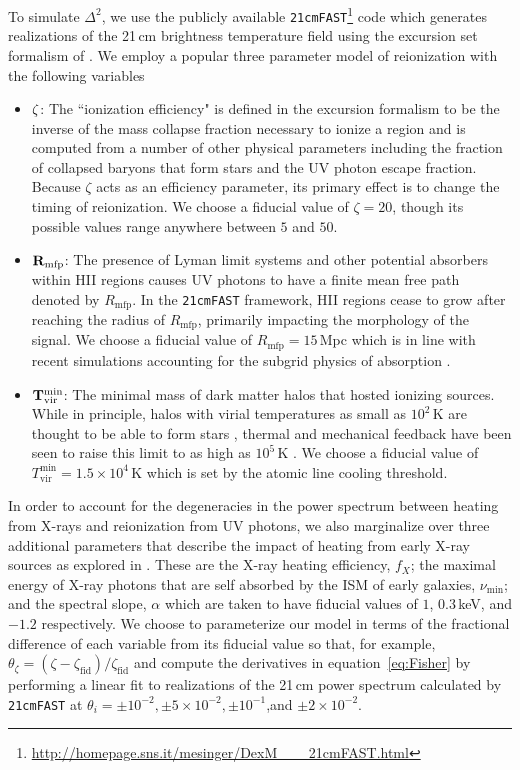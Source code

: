\documentclass[twocolumn]{emulateapj}
\begin{document}
To simulate $\Delta^2$, we use the publicly available {\tt 21cmFAST}\footnote{\url{http://homepage.sns.it/mesinger/DexM___21cmFAST.html}} code \citep{Mesinger:2011} which generates realizations of the 21\,cm brightness temperature field using the excursion set formalism of \citet{Furlanetto:2004}. We employ a popular three parameter model of reionization \citep{Mesinger:2012} with the following variables 
\begin{itemize}
\item ${\bf \zeta}$: The ``ionization efficiency" is defined in the \citet{Furlanetto:2004} excursion formalism to be the inverse of the mass collapse fraction necessary to ionize a region and is computed from a number of other physical parameters including the fraction of collapsed baryons that form stars and the UV photon escape fraction. Because $\zeta$ acts as an efficiency parameter, its primary effect is to change the timing of reionization. We choose a fiducial value of $\zeta=20$, though its possible values range anywhere between $5$ and $50$. 
\item ${\bf R_\text{mfp}}$: The presence of Lyman limit systems and other potential absorbers within HII regions causes UV photons to have a finite mean free path denoted by $R_\text{mfp}$. In the {\tt 21cmFAST} framework, HII regions cease to grow after reaching the radius of $R_\text{mfp}$, primarily impacting the morphology of the signal. We choose a fiducial value of $R_\text{mfp}=15$\,Mpc which is in line with recent simulations accounting for the subgrid physics of absorption \citep{Sobacchi:2014}. 
\item ${\bf T_\text{vir}^\text{min}}$: The minimal mass of dark matter halos that hosted ionizing sources. While in principle, halos with virial temperatures as small as $10^2$\,K are thought to be able to form stars \citep{Haiman:1996a,Tegmark:1997c}, thermal and mechanical feedback have been seen to raise this limit to as high as $10^5$\,K \citep{Springel:2003,Mesinger:2008,Okamoto:2008}. We choose a fiducial value of $T_\text{vir}^\text{min} = 1.5\times 10^4$\,K which is set by the atomic line cooling threshold. 
\end{itemize}
In order to account for the degeneracies in the power spectrum between heating from X-rays and reionization from UV photons, we also marginalize over three additional parameters that describe the impact of heating from early X-ray sources as explored in \citep{EwallWice:2015b}. These are the X-ray heating efficiency, $f_X$; the maximal energy of X-ray photons that are self absorbed by the ISM of early galaxies, $\nu_\text{min}$; and the spectral slope, $\alpha$ which are taken to have fiducial values of $1$, $0.3$\,keV, and $-1.2$ respectively. We choose to parameterize our model in terms of the fractional difference of each variable from its fiducial value so that, for example, $\theta_\zeta = (\zeta - \zeta_\text{fid})/\zeta_\text{fid}$ and compute the derivatives in equation~\ref{eq:Fisher} by performing a linear fit to realizations of the 21\,cm power spectrum calculated by {\tt 21cmFAST} at $\theta_i= \pm 10^{-2}, \pm 5\times 10^{-2}, \pm 10^{-1}$,and $ \pm 2 \times 10^{-2}$. 
\end{document}
